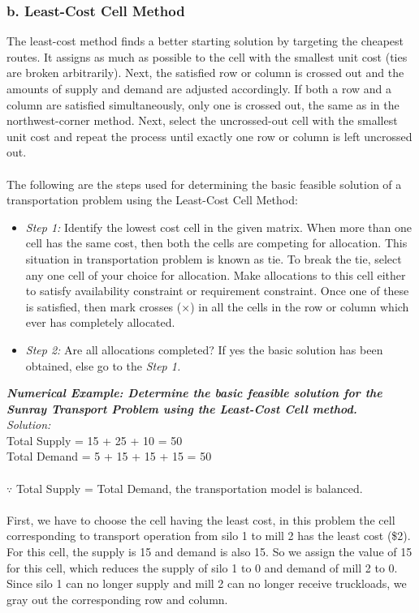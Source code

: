 \subsubsection{b. Least-Cost Cell Method}
The least-cost method finds a better starting solution by targeting the cheapest routes. It assigns as much as possible to the cell with the smallest unit cost (ties are broken arbitrarily). Next, the satisfied row or column is crossed out and the amounts of supply and demand are adjusted accordingly. If both a row and a column are satisfied simultaneously, only one is crossed out, the same as in the northwest-corner method. Next, select the uncrossed-out cell with the smallest unit cost and repeat the process until exactly one row or column is left uncrossed out.\\\\
The following are the steps used for determining the basic feasible solution of a transportation problem using the Least-Cost Cell Method:
\begin{itemize}
	\item \textit{Step 1:} Identify the lowest cost cell in the given matrix. When more than one cell has the same cost, then both the cells are competing for allocation. This situation in transportation problem is known as tie. To break the tie, select any one cell of your choice for allocation. Make allocations to this cell either to satisfy availability constraint or requirement constraint. Once one of these is satisfied, then mark crosses (×) in all the cells in the row or column which ever has completely allocated.
	\item \textit{Step 2:} Are all allocations completed? If yes the basic solution has been obtained, else go to the \textit{Step 1.}
\end{itemize}
\textbf{\textit{Numerical Example: Determine the basic feasible solution for the Sunray Transport Problem using the Least-Cost Cell method.}}\\
\textit{Solution:}\\
Total Supply = 15 + 25 + 10 = 50\\
Total Demand = 5 + 15 + 15 + 15 = 50\\\\
$\because$ Total Supply = Total Demand, the transportation model is balanced.\\\\
First, we have to choose the cell having the least cost, in this problem the cell corresponding to transport operation from silo 1 to mill 2 has the least cost (\$2). For this cell, the supply is 15 and demand is also 15. So we assign the value of 15 for this cell, which reduces the supply of silo 1 to 0 and demand of mill 2 to 0. Since silo 1 can no longer supply and mill 2 can no longer receive truckloads, we gray out the corresponding row and column.
